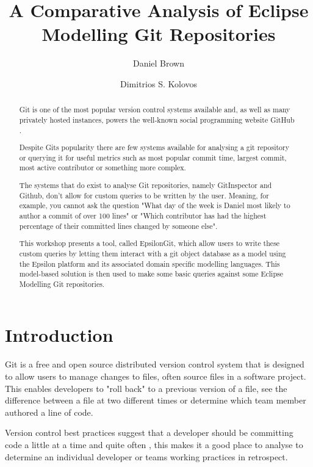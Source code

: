 \documentclass[runningheads,a4paper]{llncs}
\begin{document}
\title{A Comparative Analysis of Eclipse Modelling Git Repositories}
\author{Daniel Brown\and Dimitrios S. Kolovos}
\maketitle

\begin{abstract}
Git is one of the most popular version control systems available \cite{gitpopularity} and, as well as many privately hosted instances, powers the well-known social programming website GitHub \cite{gitpowersgithub}.

Despite Gits popularity there are few systems available for analysing a git repository or querying it for useful metrics such as most popular commit time, largest commit, most active contributor or something more complex.

The systems that do exist to analyse Git repositories, namely GitInspector \cite{gitinspector} and Github, don't allow for custom queries to be written by the user. Meaning, for example, you cannot ask the question "What day of the week is Daniel most likely to author a commit of over 100 lines" or "Which contributor has had the highest percentage of their committed lines changed by someone else". 

This workshop presents a tool, called EpsilonGit, which allow users to write these custom queries by letting them interact with a git object database as a model using the Epsilon platform and its associated domain specific modelling languages. This model-based solution is then used to make some basic queries against some Eclipse Modelling Git repositories.
\end{abstract}

\section{Introduction}
Git is a free and open source distributed version control system \cite{gitintro} that is designed to allow users to manage changes to files, often source files in a software project. This enables developers to "roll back" to a previous version of a file, see the difference between a file at two different times or determine which team member authored a line of code. 

Version control best practices suggest that a developer should be committing code a little at a time and quite often \cite{gitbestpractices}, this makes it a good place to analyse to determine an individual developer or teams working practices in retrospect.
\end{document}

